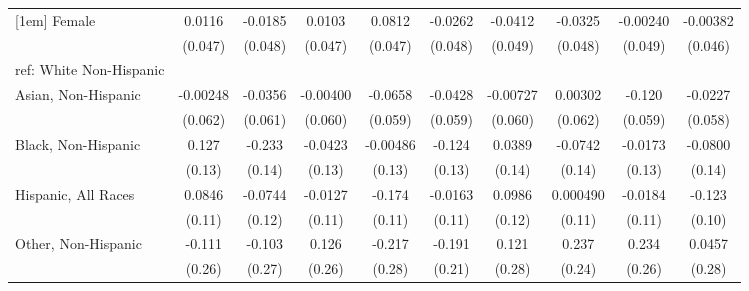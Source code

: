 \begin{table}[htbp]
\begin{tabular}{l*{9}{c}}
[1em]
Female&      0.0116         &     -0.0185         &      0.0103         &      0.0812\sym{*}  &     -0.0262         &     -0.0412         &     -0.0325         &    -0.00240         &    -0.00382         \\
  &     (0.047)         &     (0.048)         &     (0.047)         &     (0.047)         &     (0.048)         &     (0.049)         &     (0.048)         &     (0.049)         &     (0.046)         \\
[1em]
ref: White Non-Hispanic&                     &                     &                     &                     &                     &                     &                     &                     &                     \\
[1em]
Asian, Non-Hispanic&    -0.00248         &     -0.0356         &    -0.00400         &     -0.0658         &     -0.0428         &    -0.00727         &     0.00302         &      -0.120\sym{**} &     -0.0227         \\
  &     (0.062)         &     (0.061)         &     (0.060)         &     (0.059)         &     (0.059)         &     (0.060)         &     (0.062)         &     (0.059)         &     (0.058)         \\
[1em]
Black, Non-Hispanic&       0.127         &      -0.233\sym{*}  &     -0.0423         &    -0.00486         &      -0.124         &      0.0389         &     -0.0742         &     -0.0173         &     -0.0800         \\
  &      (0.13)         &      (0.14)         &      (0.13)         &      (0.13)         &      (0.13)         &      (0.14)         &      (0.14)         &      (0.13)         &      (0.14)         \\
[1em]
Hispanic, All Races&      0.0846         &     -0.0744         &     -0.0127         &      -0.174         &     -0.0163         &      0.0986         &    0.000490         &     -0.0184         &      -0.123         \\
  &      (0.11)         &      (0.12)         &      (0.11)         &      (0.11)         &      (0.11)         &      (0.12)         &      (0.11)         &      (0.11)         &      (0.10)         \\
[1em]
Other, Non-Hispanic&      -0.111         &      -0.103         &       0.126         &      -0.217         &      -0.191         &       0.121         &       0.237         &       0.234         &      0.0457         \\
  &      (0.26)         &      (0.27)         &      (0.26)         &      (0.28)         &      (0.21)         &      (0.28)         &      (0.24)         &      (0.26)         &      (0.28)         \\

\end{tabular}
\end{table}
